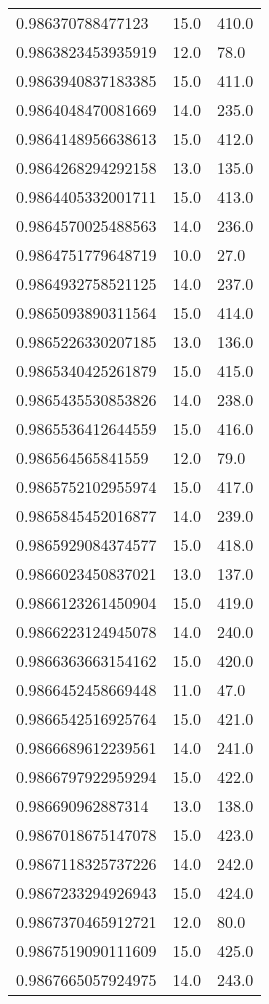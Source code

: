 \begin{center}
\begin{supertabular}[H]{p{0.30\textwidth}p{0.05\textwidth}p{0.05\textwidth}}
0.986370788477123 & 15.0 & 410.0 \\ 
0.9863823453935919 & 12.0 & 78.0 \\ 
0.9863940837183385 & 15.0 & 411.0 \\ 
0.9864048470081669 & 14.0 & 235.0 \\ 
0.9864148956638613 & 15.0 & 412.0 \\ 
0.9864268294292158 & 13.0 & 135.0 \\ 
0.9864405332001711 & 15.0 & 413.0 \\ 
0.9864570025488563 & 14.0 & 236.0 \\ 
0.9864751779648719 & 10.0 & 27.0 \\ 
0.9864932758521125 & 14.0 & 237.0 \\ 
0.9865093890311564 & 15.0 & 414.0 \\ 
0.9865226330207185 & 13.0 & 136.0 \\ 
0.9865340425261879 & 15.0 & 415.0 \\ 
0.9865435530853826 & 14.0 & 238.0 \\ 
0.9865536412644559 & 15.0 & 416.0 \\ 
0.986564565841559 & 12.0 & 79.0 \\ 
0.9865752102955974 & 15.0 & 417.0 \\ 
0.9865845452016877 & 14.0 & 239.0 \\ 
0.9865929084374577 & 15.0 & 418.0 \\ 
0.9866023450837021 & 13.0 & 137.0 \\ 
0.9866123261450904 & 15.0 & 419.0 \\ 
0.9866223124945078 & 14.0 & 240.0 \\ 
0.9866363663154162 & 15.0 & 420.0 \\ 
0.9866452458669448 & 11.0 & 47.0 \\ 
0.9866542516925764 & 15.0 & 421.0 \\ 
0.9866689612239561 & 14.0 & 241.0 \\ 
0.9866797922959294 & 15.0 & 422.0 \\ 
0.986690962887314 & 13.0 & 138.0 \\ 
0.9867018675147078 & 15.0 & 423.0 \\ 
0.9867118325737226 & 14.0 & 242.0 \\ 
0.9867233294926943 & 15.0 & 424.0 \\ 
0.9867370465912721 & 12.0 & 80.0 \\ 
0.9867519090111609 & 15.0 & 425.0 \\ 
0.9867665057924975 & 14.0 & 243.0 \\ 

\end{supertabular}
\end{center}
